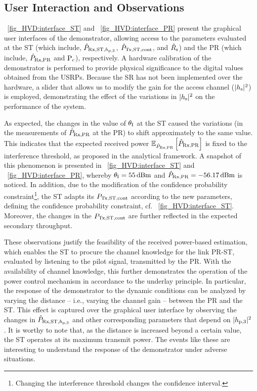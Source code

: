 \subsection{User Interaction and Observations}
\figurename~\ref{fig_HVD:interface_ST} and \figurename~\ref{fig_HVD:interface_PR} present the graphical user interfaces of the demonstrator, allowing access to the parameters evaluated at the ST (which include, $\hat{P}_{\text{Rx,ST,$h_{\text{p,3}}$}}$, $\hat{P}_{\text{Tx,ST,cont}}$, and $\hat{{{R}}}_{\text{s}}$) and the PR (which include, $\hat{P}_{\text{Rx,PR}}$ and $\text{P}_{\text{c}}$), respectively. A hardware calibration of the demonstrator is performed to provide physical significance to the digital values obtained from the USRPs. Because the SR has not been implemented over the hardware, a slider that allows us to modify the gain for the access channel ($|h_{\text{s}}|^2$) is employed, demonstrating the effect of the variations in $|h_{\text{s}}|^2$ on the performance of the system. %

As expected, the changes in the value of $\theta_{\text{I}}$ at the ST caused the variations (in the measurements of $\hat{P}_{\text{Rx,PR}}$ at the PR) to shift approximately to the same value. This indicates that the expected received power ${\mathbb E}_{\hat{P}_{\text{Rx,PR}}}\left[ \hat{P}_{\text{Rx,PR}} \right]$ is fixed to the interference threshold, as proposed in the analytical framework. A snapshot of this phenomenon is presented in \figurename~\ref{fig_HVD:interface_ST} and \figurename~\ref{fig_HVD:interface_PR}, whereby $\theta_{\text{I}} = \SI{55}{dBm}$ and $\hat{P}_{\text{Rx,PR}} = \SI{-56.17}{dBm}$ is noticed. In addition, due to the modification of the confidence probability constraint\footnote{Changing the interference threshold changes the confidence interval.}, the ST adapts its $P_{\text{Tx,ST,cont}}$ according to the new parameters, defining the confidence probability constraint, cf. \figurename~\ref{fig_HVD:interface_ST}. Moreover, the changes in the $P_{\text{Tx,ST,cont}}$ are further reflected in the expected secondary throughput. 

These observations justify the feasibility of the received power-based estimation, which enables the ST to procure the channel knowledge for the link PR-ST, evaluated by listening to the pilot signal, transmitted by the PR. With the availability of channel knowledge, this further demonstrates the operation of the power control mechanism in accordance to the underlay principle. In particular, the response of the demonstrator to the dynamic conditions can be analyzed by varying the distance -- i.e., varying the channel gain -- between the PR and the ST. This effect is captured over the graphical user interface by observing the changes in $\hat{P}_{\text{Rx,ST,$h_{\text{p,3}}$}}$ and other corresponding parameters that depend on $|h_{\text{p,3}}|^2$. It is worthy to note that, as the distance is increased beyond a certain value, the ST operates at its maximum transmit power. The events like these are interesting to understand the response of the demonstrator under adverse situations.%


